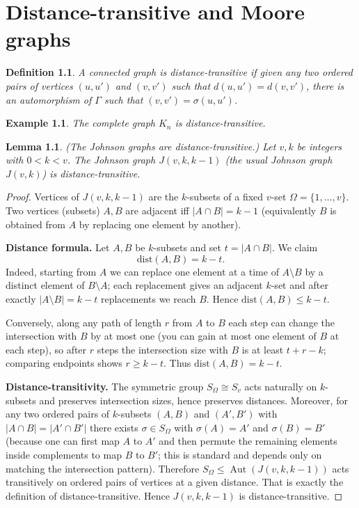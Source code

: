 \documentclass[12pt,a4paper,openany]{book}
\newtheorem{definition}{Definition}[section]
\newtheorem{example}{Example}[section]
\newtheorem{lemma}{Lemma}[section]
\begin{document}
\chapter{Distance-transitive  and Moore graphs}

\begin{definition}
A connected graph is \emph{distance-transitive} if given any two ordered pairs of vertices $(u, u')$ and $(v, v')$ such that $d(u, u') = d(v, v')$, there is an automorphism of $\Gamma$ such that $(v, v') = \sigma(u, u')$.
\end{definition}

\begin{example}
The complete graph $K_n$ is distance-transitive.
\end{example}

\begin{lemma}
(The Johnson graphs are distance-transitive.)
Let $v,k$ be integers with $0<k<v$. The Johnson graph $J(v,k,k-1)$
(the usual Johnson graph $J(v,k)$) is distance-transitive.
\end{lemma}

\begin{proof}
Vertices of $J(v,k,k-1)$ are the $k$-subsets of a fixed $v$-set
$\Omega=\{1,\dots,v\}$. Two vertices (subsets) $A,B$ are adjacent iff
$|A\cap B|=k-1$ (equivalently $B$ is obtained from $A$ by replacing one
element by another).

\textbf{Distance formula.} Let $A,B$ be $k$-subsets and set
$t=|A\cap B|$. We claim
\[
\mathrm{dist}(A,B)=k-t.
\]
Indeed, starting from $A$ we can replace one element at a time of
$A\setminus B$ by a distinct element of $B\setminus A$; each replacement
gives an adjacent $k$-set and after exactly $|A\setminus B|=k-t$
replacements we reach $B$. Hence $\mathrm{dist}(A,B)\le k-t$.

Conversely, along any path of length $r$ from $A$ to $B$ each step can
change the intersection with $B$ by at most one (you can gain at most
one element of $B$ at each step), so after $r$ steps the intersection
size with $B$ is at least $t+r-k$; comparing endpoints shows $r\ge k-t$.
Thus $\mathrm{dist}(A,B)=k-t$.

\textbf{Distance-transitivity.} The symmetric group $S_\Omega\cong S_v$
acts naturally on $k$-subsets and preserves intersection sizes, hence
preserves distances. Moreover, for any two ordered pairs of $k$-subsets
\((A,B)\) and \((A',B')\) with \(|A\cap B|=|A'\cap B'|\) there exists
\(\sigma\in S_\Omega\) with \(\sigma(A)=A'\) and \(\sigma(B)=B'\)
(because one can first map \(A\) to \(A'\) and then permute the remaining
elements inside complements to map \(B\) to \(B'\); this is standard and
depends only on matching the intersection pattern). Therefore
$S_\Omega\le\operatorname{Aut}(J(v,k,k-1))$ acts transitively on ordered
pairs of vertices at a given distance. That is exactly the definition of
distance-transitive. Hence $J(v,k,k-1)$ is distance-transitive.
\end{proof}
\end{document}
